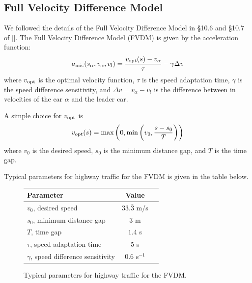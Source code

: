 \documentclass[12pt]{article}
\begin{document}
    \subsection{Full Velocity Difference Model}\label{ch3.1}
    We followed the details of the Full Velocity Difference Model in \S 10.6 and \S 10.7 of [\cite{traffic}]. The Full Velocity Difference Model (FVDM) is given by the acceleration function: 
    \begin{equation}\label{a_mic}
      a_{\rm mic}(s_\alpha,v_\alpha,v_l) = \frac{v_{\rm opt} (s) - v_\alpha}{\tau} - \gamma \Delta v 
    \end{equation}
    where $v_{\rm opt}$ is the optimal velocity function, $\tau$ is the speed adaptation time, $\gamma$ is the speed difference sensitivity, and $\Delta v = v_\alpha - v_l$ is the difference between in velocities of the car $\alpha$ and the leader car.
    
    A simple choice for $v_{\rm opt}$ is 
    \begin{equation} 
      v_{\rm opt} (s) = \max \left( 0, \min \left( v_0, \frac{s-s_0}{T} \right) \right)
    \end{equation}
    where $v_0$ is the desired speed, $s_0$ is the minimum distance gap, and $T$ is the time gap. 

    Typical parameters for highway traffic for the FVDM is given in the table below. 
    \begin{figure}[H]
      \begin{center}
        \begin{tabular}{l c c } 
        Parameter & Value \\
        \hline
        $v_0$, desired speed & $33.\bar{3}$ m/s \\
        $s_0$, minimum distance gap & $3$ m \\
        $T$, time gap & $1.4$ s \\
        $\tau$, speed adaptation time & $5$ s \\
        $\gamma$, speed difference sensitivity & $0.6$ s$^{-1}$ \\
        \end{tabular}
        \end{center}
        \caption{Typical parameters for highway traffic for the FVDM.}
        \label{fig:parameters}
    \end{figure}
    
\end{document}
